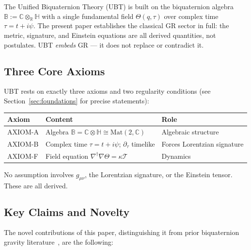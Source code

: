 \documentclass[12pt,a4paper]{article}
\theoremstyle{definition}
\theoremstyle{remark}
\newcommand{\B}{\mathbb{B}}
\newcommand{\R}{\mathbb{R}}
\newcommand{\C}{\mathbb{C}}
\newcommand{\Hquat}{\mathbb{H}}
\newcommand{\gmn}{g_{\mu\nu}}
\newcommand{\pT}{\partial_\tau}
\begin{document}
The Unified Biquaternion Theory (UBT) is built on the biquaternion algebra
$\B := \C\otimes_\R\Hquat$ with a single fundamental field $\Theta(q,\tau)$ over
complex time $\tau = t + i\psi$.  The present paper establishes the classical GR
sector in full: the metric, signature, and Einstein equations are all derived
quantities, not postulates.  UBT \emph{embeds} GR — it does not replace or
contradict it.

\subsection{Three Core Axioms}
\label{sec:axioms_intro}

UBT rests on exactly three axioms and two regularity conditions
(see Section~\ref{sec:foundations} for precise statements):

\begin{center}
\begin{tabular}{lll}
\toprule
\textbf{Axiom} & \textbf{Content} & \textbf{Role} \\
\midrule
AXIOM-A & Algebra $\B = \C\otimes\Hquat \cong \mathrm{Mat}(2,\C)$ & Algebraic structure \\
AXIOM-B & Complex time $\tau = t+i\psi$; $\pT$ timelike & Forces Lorentzian signature \\
AXIOM-F & Field equation $\nabla^\dagger\nabla\Theta = \kappa\mathcal{T}$ & Dynamics \\
\bottomrule
\end{tabular}
\end{center}

No assumption involves $\gmn$, the Lorentzian signature, or the Einstein tensor.
These are all derived.

\subsection{Key Claims and Novelty}
\label{sec:novelty}

The novel contributions of this paper, distinguishing it from prior biquaternion
gravity literature~\cite{Adler1995,DeLeo1996,Finkelstein1962}, are the following:
\end{document}
